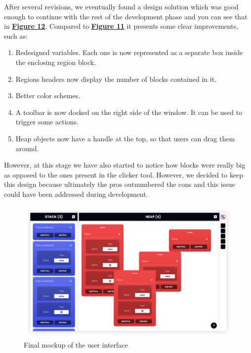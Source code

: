 \documentclass[]{usiinfbachelorproject}
\begin{document}
\noindent After several revisions, we eventually found a design solution which was good enough to continue with the rest of the development phase and you can see that in \hyperref[final ui]{\textbf{Figure 12}}. Compared to \hyperref[separate regions]{\textbf{Figure 11}} it presents some clear improvements, such as:

\begin{enumerate}
	\item Redesigned variables. Each one is now represented as a separate box inside the enclosing region block.
	\item Regions headers now display the number of blocks contained in it.
	\item Better color schemes.
	\item A toolbar is now docked on the right side of the window. It can be used to trigger some actions.
	\item Heap objects now have a handle at the top, so that users can drag them around.
\end{enumerate}

\noindent However, at this stage we have also started to notice how blocks were really big as opposed to the ones present in the clicker tool. However, we decided to keep this design because ultimately the pros outnumbered the cons and this issue could have been addressed during development.

\vspace{\fill}
\pagebreak

\begin{figure}[h!]
\centering
\includegraphics[width=\textwidth]{figures/final_mockup.png}
\caption {Final mockup of the user interface}
\label{final ui}
\end{figure}
\end{document}
